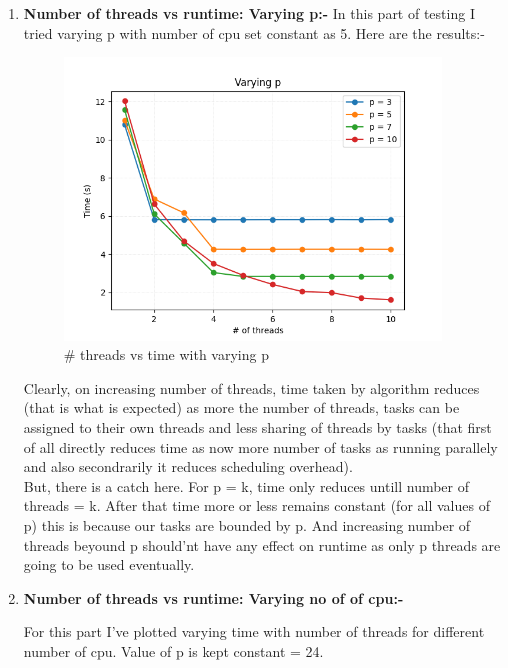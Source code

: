 \documentclass{article}
\begin{document}
\begin{enumerate}
\begin{enumerate}
        \item \textbf{Number of threads vs runtime: Varying p:- }
        In this part of testing I tried varying p with number of cpu set constant as 5.
        Here are the results:- 

        \begin{figure}[H]
            \centering
            \includegraphics[width=10cm]{../varyingp.png}
            \caption{\# threads vs time with varying p}
        \end{figure}

        Clearly, on increasing number of threads, time taken by algorithm reduces (that is what is expected) as more the number of threads, 
        tasks can be assigned to their own threads and less sharing of threads by tasks (that first of all directly reduces time as now more number of 
        tasks as running parallely and also secondrarily it reduces scheduling overhead).\\
        But, there is a catch here. For p = k, time only reduces untill number of threads = k. After that time more or less remains constant (for all values 
        of p) this is because our tasks are bounded by p. And increasing number of threads beyound p should'nt have any effect on runtime as only p threads are going to 
        be used eventually.
        
        \item \textbf{Number of threads vs runtime: Varying no of of cpu:- }
        
        For this part I've plotted varying time with number of threads for different number of cpu. Value of p is kept constant = 24. \\


\end{enumerate}
\end{enumerate}
\end{document}
